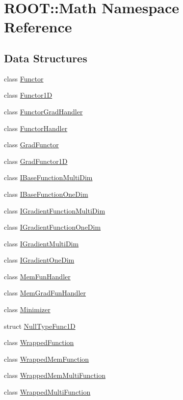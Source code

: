 \hypertarget{namespaceROOT_1_1Math}{}\section{R\+O\+OT\+:\+:Math Namespace Reference}
\label{namespaceROOT_1_1Math}
\subsection*{Data Structures}
\begin{DoxyCompactItemize}
\item 
class \mbox{\hyperlink{classROOT_1_1Math_1_1Functor}{Functor}}
\item 
class \mbox{\hyperlink{classROOT_1_1Math_1_1Functor1D}{Functor1D}}
\item 
class \mbox{\hyperlink{classROOT_1_1Math_1_1FunctorGradHandler}{Functor\+Grad\+Handler}}
\item 
class \mbox{\hyperlink{classROOT_1_1Math_1_1FunctorHandler}{Functor\+Handler}}
\item 
class \mbox{\hyperlink{classROOT_1_1Math_1_1GradFunctor}{Grad\+Functor}}
\item 
class \mbox{\hyperlink{classROOT_1_1Math_1_1GradFunctor1D}{Grad\+Functor1D}}
\item 
class \mbox{\hyperlink{classROOT_1_1Math_1_1IBaseFunctionMultiDim}{I\+Base\+Function\+Multi\+Dim}}
\item 
class \mbox{\hyperlink{classROOT_1_1Math_1_1IBaseFunctionOneDim}{I\+Base\+Function\+One\+Dim}}
\item 
class \mbox{\hyperlink{classROOT_1_1Math_1_1IGradientFunctionMultiDim}{I\+Gradient\+Function\+Multi\+Dim}}
\item 
class \mbox{\hyperlink{classROOT_1_1Math_1_1IGradientFunctionOneDim}{I\+Gradient\+Function\+One\+Dim}}
\item 
class \mbox{\hyperlink{classROOT_1_1Math_1_1IGradientMultiDim}{I\+Gradient\+Multi\+Dim}}
\item 
class \mbox{\hyperlink{classROOT_1_1Math_1_1IGradientOneDim}{I\+Gradient\+One\+Dim}}
\item 
class \mbox{\hyperlink{classROOT_1_1Math_1_1MemFunHandler}{Mem\+Fun\+Handler}}
\item 
class \mbox{\hyperlink{classROOT_1_1Math_1_1MemGradFunHandler}{Mem\+Grad\+Fun\+Handler}}
\item 
class \mbox{\hyperlink{classROOT_1_1Math_1_1Minimizer}{Minimizer}}
\item 
struct \mbox{\hyperlink{structROOT_1_1Math_1_1NullTypeFunc1D}{Null\+Type\+Func1D}}
\item 
class \mbox{\hyperlink{classROOT_1_1Math_1_1WrappedFunction}{Wrapped\+Function}}
\item 
class \mbox{\hyperlink{classROOT_1_1Math_1_1WrappedMemFunction}{Wrapped\+Mem\+Function}}
\item 
class \mbox{\hyperlink{classROOT_1_1Math_1_1WrappedMemMultiFunction}{Wrapped\+Mem\+Multi\+Function}}
\item 
class \mbox{\hyperlink{classROOT_1_1Math_1_1WrappedMultiFunction}{Wrapped\+Multi\+Function}}
\end{DoxyCompactItemize}
